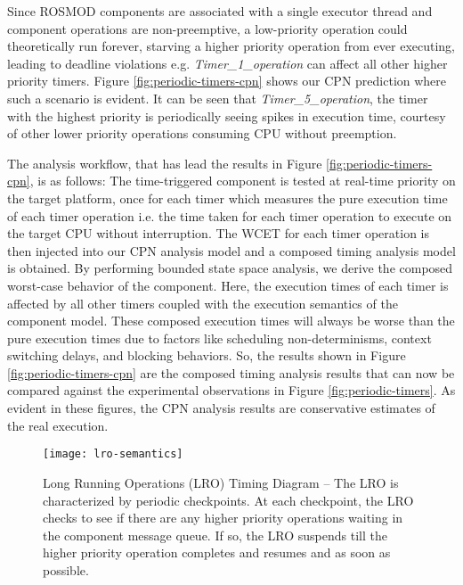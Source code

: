 Since ROSMOD components are associated with a single executor thread and component operations are non-preemptive, a low-priority operation could theoretically run forever, starving a higher priority operation from ever executing, leading to deadline violations e.g. \emph{Timer\_1\_operation} can affect all other higher priority timers. Figure \ref{fig:periodic-timers-cpn} shows our CPN prediction where such a scenario is evident. It can be seen that \emph{Timer\_5\_operation}, the timer with the highest priority is periodically seeing spikes in execution time, courtesy of other lower priority operations consuming CPU without preemption.

The analysis workflow, that has lead the results in Figure \ref{fig:periodic-timers-cpn}, is as follows: The time-triggered component is tested at real-time priority on the target platform, once for each timer which measures the pure execution time of each timer operation i.e. the time taken for each timer operation to execute on the target CPU without interruption. The WCET for each timer operation is then injected into our CPN analysis model and a composed timing analysis model is obtained. By performing bounded state space analysis, we derive the composed worst-case behavior of the component. Here, the execution times of each timer is affected by all other timers coupled with the execution semantics of the component model. These composed execution times will always be worse than the pure execution times due to factors like scheduling non-determinisms, context switching delays, and blocking behaviors. So, the results shown in Figure \ref{fig:periodic-timers-cpn} are the composed timing analysis results that can now be compared against the experimental observations in Figure \ref{fig:periodic-timers}. As evident in these figures, the CPN analysis results are conservative estimates of the real execution. 


\begin{figure}[h]
	\centering
	\texttt{[image: lro-semantics]}
	\caption{Long Running Operations (LRO) Timing Diagram -- The LRO is characterized by periodic checkpoints. At each checkpoint, the LRO checks to see if there are any higher priority operations waiting in the component message queue. If so, the LRO suspends till the higher priority operation completes and resumes and as soon as possible.}
	\label{fig:lro-semantics}
\end{figure}

